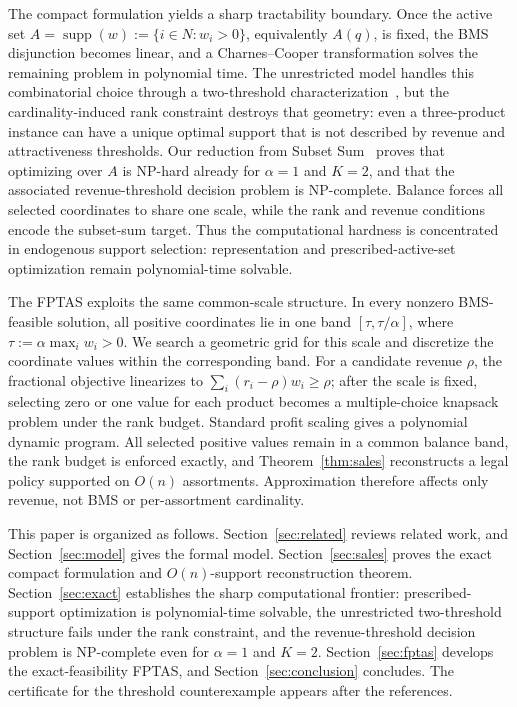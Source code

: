 \documentclass[11pt]{article}
\newcommand{\supp}{\operatorname{supp}}
\begin{document}
The compact formulation yields a sharp tractability boundary. Once the active set $A=\supp(w):=\{i\in N:w_i>0\}$, equivalently $A(q)$, is fixed, the BMS disjunction becomes linear, and a Charnes--Cooper transformation solves the remaining problem in polynomial time. The unrestricted model handles this combinatorial choice through a two-threshold characterization~\cite{EFTopaloglu}, but the cardinality-induced rank constraint destroys that geometry: even a three-product instance can have a unique optimal support that is not described by revenue and attractiveness thresholds. Our reduction from Subset Sum~\cite{GareyJohnson} proves that optimizing over $A$ is NP-hard already for $\alpha=1$ and $K=2$, and that the associated revenue-threshold decision problem is NP-complete. Balance forces all selected coordinates to share one scale, while the rank and revenue conditions encode the subset-sum target. Thus the computational hardness is concentrated in endogenous support selection: representation and prescribed-active-set optimization remain polynomial-time solvable.

The FPTAS exploits the same common-scale structure. In every nonzero BMS-feasible solution, all positive coordinates lie in one band $[\tau,\tau/\alpha]$, where $\tau:=\alpha\max_iw_i>0$. We search a geometric grid for this scale and discretize the coordinate values within the corresponding band. For a candidate revenue $\rho$, the fractional objective linearizes to $\sum_i(r_i-\rho)w_i\ge\rho$; after the scale is fixed, selecting zero or one value for each product becomes a multiple-choice knapsack problem under the rank budget. Standard profit scaling gives a polynomial dynamic program. All selected positive values remain in a common balance band, the rank budget is enforced exactly, and Theorem~\ref{thm:sales} reconstructs a legal policy supported on $O(n)$ assortments. Approximation therefore affects only revenue, not BMS or per-assortment cardinality.

This paper is organized as follows. Section~\ref{sec:related} reviews related work, and Section~\ref{sec:model} gives the formal model. Section~\ref{sec:sales} proves the exact compact formulation and $O(n)$-support reconstruction theorem. Section~\ref{sec:exact} establishes the sharp computational frontier: prescribed-support optimization is polynomial-time solvable, the unrestricted two-threshold structure fails under the rank constraint, and the revenue-threshold decision problem is NP-complete even for $\alpha=1$ and $K=2$. Section~\ref{sec:fptas} develops the exact-feasibility FPTAS, and Section~\ref{sec:conclusion} concludes. The certificate for the threshold counterexample appears after the references.
\end{document}
